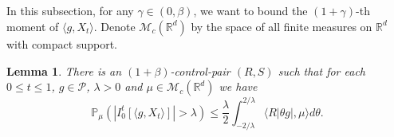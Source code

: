 \documentclass[12pt,oneside,english]{amsart}
\theoremstyle{plain}
\newtheorem{lem}[thm]{Lemma}
\theoremstyle{definition}
\numberwithin{equation}{section}
\begin{document}
\begin{comment}
    Therefore, for any $\mu\in \mathcal M(\mathbb R^d)$ with compact support, $k \in \mathbb{N}$, $\theta \in \mathbb{R}$ and $0\leq s\leq1$, using Jensen's inequality,
\begin{align*}
    &|\varphi_{k,\mu,s}(\theta)-1- \langle Z_{g_k}(s,\cdot, \theta),\mu\rangle|\\
    &\leq |\langle v_{g_k}(s,\cdot,\theta)-i\theta T_s^{\alpha}g_k, \mu \rangle|^2 + \langle |v_{g_k}(s,\cdot,\theta)-\tilde{v}_{g_k}(s,\cdot,\theta)|, \mu \rangle
    \\&\leq \langle |v_{g_k}(s,\cdot,\theta)-i\theta T_s^{\alpha}g_k|^2, \mu \rangle + \langle |v_{g_k}(s,\cdot,\theta)-\tilde{v}_{g_k}(s,\cdot,\theta)|, \mu \rangle
    \\&\leq e^{2\alpha}|C_g\theta e^{(\alpha-\kappa b)k+\alpha}|^{2+2\beta}\langle (\tilde R^g)^2,\mu\rangle + |C_g\theta e^{(\alpha-\kappa b)k}|^{1+2\beta}\langle R^g_1,\mu\rangle.
    \qedhere
\end{align*}
\end{proof}
\end{comment}

\subsection{}

 In this subsection, for any $\gamma \in (0,\beta)$, we want to bound the $(1+\gamma)$-th moment of $\langle g ,X_t \rangle$. Denote $\mathcal{M}_c(\mathbb{R}^d)$ by the space of all finite measures on $\mathbb{R}^d$ with compact support.
\begin{lem}
\label{lem: control pair for P(M>lambda)}
    There is an $(1+\beta)$-control-pair $(R,S)$ such that for each $0\leq t\leq 1$, $g\in \mathcal P$, $\lambda >0$ and $\mu\in \mathcal M_c(\mathbb R^d)$ we have
\[
    \mathbb P_\mu ( |I_0^t[\langle g,X_t\rangle]| > \lambda)
    \leq \frac{\lambda}{2}\int_{-2/\lambda}^{2/\lambda}\langle R|\theta g|,\mu\rangle d\theta.
\]
\end{lem}
\end{document}
